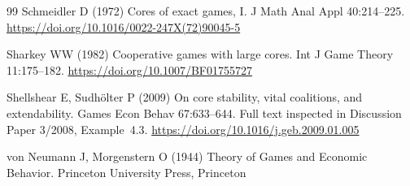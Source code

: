 \documentclass[11pt]{article}
\begin{document}
\begin{thebibliography}{99}
Schmeidler D (1972) Cores of exact games, I.
J Math Anal Appl 40:214--225.
\url{https://doi.org/10.1016/0022-247X(72)90045-5}

Sharkey WW (1982) Cooperative games with large cores.
Int J Game Theory 11:175--182.
\url{https://doi.org/10.1007/BF01755727}

Shellshear E, Sudh\"olter P (2009) On core stability, vital coalitions, and
extendability. Games Econ Behav 67:633--644.
Full text inspected in Discussion Paper 3/2008, Example~4.3.
\url{https://doi.org/10.1016/j.geb.2009.01.005}

von Neumann J, Morgenstern O (1944) Theory of Games and Economic Behavior.
Princeton University Press, Princeton

\end{thebibliography}
\end{document}
